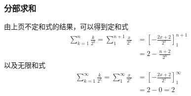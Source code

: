 \documentclass[14pt,notheorems,leqno,xcolor={rgb}]{beamer} %
\begin{document}
\begin{frame}
\frametitle{分部求和}
由上页不定和式的结果，可以得到定和式
\begin{align*}
\sum_{k=1}^n \frac{k}{2^k} = \sum\nolimits_1^{n+1} \frac{x}{2^x} &= \left[-\frac{2x+2}{2^x}\right]_1^{n+1} \\
&= 2-\frac{n+2}{2^n}
\end{align*}\pause
以及无限和式
\begin{align*}
\sum_{k=1}^{\infty} \frac{k}{2^k} = \sum\nolimits_1^{\infty} \frac{x}{2^x} &= \left[-\frac{2x+2}{2^x}\right]_1^{\infty} \\
&= 2-0 = 2
\end{align*}
\end{frame}
\end{document}
